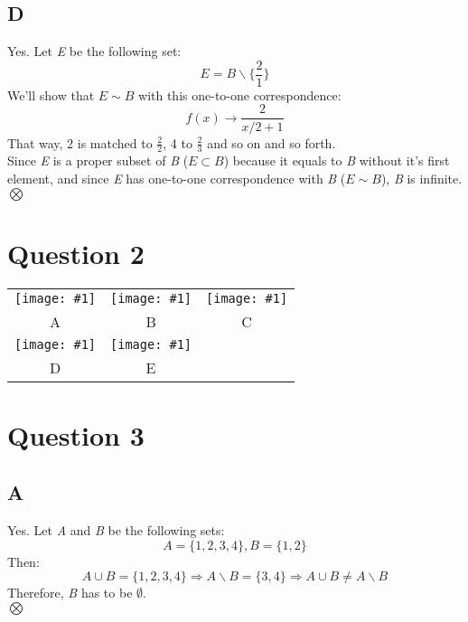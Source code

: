 \documentclass[12pt, oneside]{article}
\newcommand{\img}[1] {
	\texttt{[image: \#1]}
}
\begin{document}
\subsection{D}
Yes. Let \emph{E} be the following set:
\begin{equation*}
E = B\backslash\{\frac{2}{1}\}
\end{equation*}
We'll show that $E \sim B$ with this one-to-one correspondence:
\begin{equation*}
f(x) \rightarrow \frac{2}{x/2+1}
\end{equation*}
That way, 2 is matched to $\frac{2}{2}$, 4 to $\frac{2}{3}$ and so on and so forth.\\
Since \emph{E} is a proper subset of \emph{B} ($E \subset B$) because it equals to \emph{B} without it's first element, and since \emph{E} has one-to-one correspondence with \emph{B} ($E \sim B$), \emph{B} is infinite.\\
$\bigotimes$

\section{Question 2}
\begin{center}
\begin{tabular}{ c c c }
\img{A} & \img{B} & \img{C}\\
A & B & C\\
\img{D} & \img{E}\\
D & E\\
\end{tabular}
\end{center}

\section{Question 3}
\subsection{A}
Yes. Let \emph{A} and \emph{B} be the following sets:
\begin{equation*}
A = \{1, 2, 3, 4\}, B = \{1, 2\}
\end{equation*}
Then:
\begin{equation*}
A \cup B = \{1, 2, 3, 4\}\Rightarrow
A \backslash B = \{3, 4\}\Rightarrow
A \cup B \neq A \backslash B
\end{equation*}
Therefore, \emph{B} has to be $\emptyset$.\\
$\bigotimes$
\end{document}

